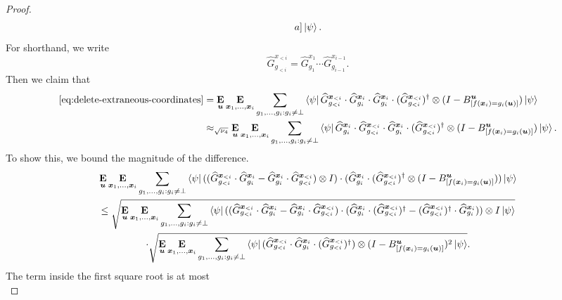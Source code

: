 \begin{proof}
\begin{align}
{    a]} \ket{\psi}.\label{eq:delete-extraneous-coordinates}
\end{align}
For shorthand, we write
\begin{equation*}
\widehat{G}^{x_{<i}}_{g_{<i}} = \widehat{G}^{x_1}_{g_1} \cdots \widehat{G}^{x_{i-1}}_{g_{i-1}}.
\end{equation*}
Then we claim that
\begin{align}
\eqref{eq:delete-extraneous-coordinates}
& = \mathop{\bf E\/}_{\boldsymbol{u}}  \mathop{\bf E\/}_{{\boldsymbol{x}}_1, \dots, {\boldsymbol{x}}_i} \sum_{g_1, \dots, g_i: g_i \neq \bot}   \bra{\psi}
  \widehat{G}^{{\boldsymbol{x}}_{<i}}_{g_{<i}}  \cdot \widehat{G}^{{\boldsymbol{x}}_i}_{g_i} \cdot \widehat{G}^{{\boldsymbol{x}}_i}_{g_i} \cdot (\widehat{G}^{{\boldsymbol{x}}_{<i}}_{g_{<i}} )^\dagger \otimes (I - B^{\boldsymbol{u}}_{[f({\boldsymbol{x}}_i) =
    g_i(\boldsymbol{u})]}) \ket{\psi}\nonumber\\
& \approx_{\sqrt{\nu_4}} \mathop{\bf E\/}_{\boldsymbol{u}}  \mathop{\bf E\/}_{{\boldsymbol{x}}_1, \dots, {\boldsymbol{x}}_i} \sum_{g_1, \dots, g_i: g_i \neq \bot} \bra{\psi}\widehat{G}^{{\boldsymbol{x}}_i}_{g_i} \cdot
  \widehat{G}^{{\boldsymbol{x}}_{<i}}_{g_{<i}}  \cdot  \widehat{G}^{{\boldsymbol{x}}_i}_{g_i}\cdot (\widehat{G}^{{\boldsymbol{x}}_{<i}}_{g_{<i}} )^\dagger \otimes (I - B^{\boldsymbol{u}}_{[f({\boldsymbol{x}}_i) =
    g_i(\boldsymbol{u})]}) \ket{\psi}.\label{eq:gonna-need-a-bigger-cauchy-schwarz}
\end{align}
To show this, we bound the magnitude of the difference.
\begin{multline*}
\mathop{\bf E\/}_{\boldsymbol{u}}  \mathop{\bf E\/}_{{\boldsymbol{x}}_1, \dots, {\boldsymbol{x}}_i} \sum_{g_1, \dots, g_i: g_i \neq \bot}  \bra{\psi}
  ((\widehat{G}^{{\boldsymbol{x}}_{<i}}_{g_{<i}}  \cdot \widehat{G}^{{\boldsymbol{x}}_i}_{g_i} - \widehat{G}^{{\boldsymbol{x}}_i}_{g_i}  \cdot \widehat{G}^{{\boldsymbol{x}}_{<i}}_{g_{<i}}) \otimes I) \cdot (\widehat{G}^{{\boldsymbol{x}}_i}_{g_i} \cdot (\widehat{G}^{{\boldsymbol{x}}_{<i}}_{g_{<i}} )^\dagger \otimes (I - B^{\boldsymbol{u}}_{[f({\boldsymbol{x}}_i) =
    g_i(\boldsymbol{u})]})) \ket{\psi}\\
    \leq 
    \sqrt{\mathop{\bf E\/}_{\boldsymbol{u}}  \mathop{\bf E\/}_{{\boldsymbol{x}}_1, \dots, {\boldsymbol{x}}_i} \sum_{g_1, \dots, g_i: g_i \neq \bot}   \bra{\psi}
  ((\widehat{G}^{{\boldsymbol{x}}_{<i}}_{g_{<i}}  \cdot \widehat{G}^{{\boldsymbol{x}}_i}_{g_i} - \widehat{G}^{{\boldsymbol{x}}_i}_{g_i}  \cdot \widehat{G}^{{\boldsymbol{x}}_{<i}}_{g_{<i}})  \cdot  (\widehat{G}^{{\boldsymbol{x}}_i}_{g_i}\cdot (\widehat{G}^{{\boldsymbol{x}}_{<i}}_{g_{<i}})^\dagger - (\widehat{G}^{{\boldsymbol{x}}_{<i}}_{g_{<i}})^\dagger \cdot \widehat{G}^{{\boldsymbol{x}}_i}_{g_i})) \otimes I \ket{\psi}}\\
  \cdot \sqrt{\mathop{\bf E\/}_{\boldsymbol{u}}  \mathop{\bf E\/}_{{\boldsymbol{x}}_1, \dots, {\boldsymbol{x}}_i} \sum_{g_1, \dots, g_i: g_i \neq \bot}  \bra{\psi}
  (\widehat{G}^{{\boldsymbol{x}}_{<i}}_{g_{<i}}  \cdot \widehat{G}^{{\boldsymbol{x}}_i}_{g_i} \cdot (\widehat{G}^{{\boldsymbol{x}}_{<i}}_{g_{<i}} )^\dagger) \otimes (I - B^{\boldsymbol{u}}_{[f({\boldsymbol{x}}_i) =
    g_i(\boldsymbol{u})]})^2 \ket{\psi}}.
\end{multline*}
The term inside the first square root is at most 
\begin{equation}\label{eq:add-in-the-bot}

\end{equation}
\end{proof}
